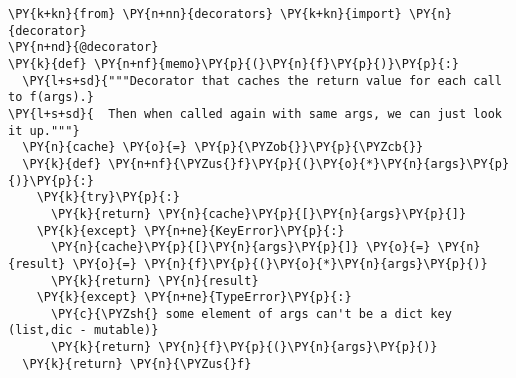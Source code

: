 \begin{Verbatim}[commandchars=\\\{\}]
\PY{k+kn}{from} \PY{n+nn}{decorators} \PY{k+kn}{import} \PY{n}{decorator}
\PY{n+nd}{@decorator}
\PY{k}{def} \PY{n+nf}{memo}\PY{p}{(}\PY{n}{f}\PY{p}{)}\PY{p}{:}
  \PY{l+s+sd}{"""Decorator that caches the return value for each call to f(args).}
\PY{l+s+sd}{  Then when called again with same args, we can just look it up."""}
  \PY{n}{cache} \PY{o}{=} \PY{p}{\PYZob{}}\PY{p}{\PYZcb{}}
  \PY{k}{def} \PY{n+nf}{\PYZus{}f}\PY{p}{(}\PY{o}{*}\PY{n}{args}\PY{p}{)}\PY{p}{:}
    \PY{k}{try}\PY{p}{:}
      \PY{k}{return} \PY{n}{cache}\PY{p}{[}\PY{n}{args}\PY{p}{]}
    \PY{k}{except} \PY{n+ne}{KeyError}\PY{p}{:}
      \PY{n}{cache}\PY{p}{[}\PY{n}{args}\PY{p}{]} \PY{o}{=} \PY{n}{result} \PY{o}{=} \PY{n}{f}\PY{p}{(}\PY{o}{*}\PY{n}{args}\PY{p}{)}
      \PY{k}{return} \PY{n}{result}
    \PY{k}{except} \PY{n+ne}{TypeError}\PY{p}{:}
      \PY{c}{\PYZsh{} some element of args can't be a dict key (list,dic - mutable)}
      \PY{k}{return} \PY{n}{f}\PY{p}{(}\PY{n}{args}\PY{p}{)}
  \PY{k}{return} \PY{n}{\PYZus{}f}
\end{Verbatim}

